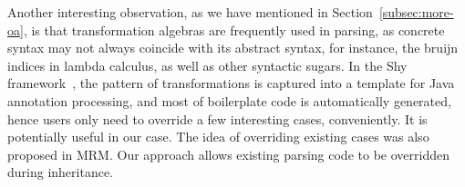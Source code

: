 \begin{comment}
Moreover, in~\cite{Oliveira:2012} the authors have discussed the
composition of algebras. In our parsing approach, a parser consumes an
algebra, which is delegated to return the results, during its process
of parsing. Having a set of algebras, it requires multiple parsing
with several times of invocation, which leads to redundant work.
Instead, algebras are supposed to be composed into one before the
invocation of the parser. Bahr et al. lead a similar discussion
in~\cite{Bahr2011}, where queries (or \textit{catamorphisms}) and
transformations (or \textit{homomorphisms}) are composable. They have
also mentioned the dual process of folds, namely
\textit{anamorphisms}. It is potentially related to our work, as
parsing is a representative kind of unfolds, whereas they only
discussed the composition of a cv-coalgebra and a term homomorphism,
which differs from modular parsing.
\end{comment}

Another interesting observation, as we have mentioned
in Section~\ref{subsec:more-oa}, is that transformation algebras are
frequently used in parsing, as concrete syntax may not always coincide
with its abstract syntax, for instance, the bruijn indices in lambda
calculus, as well as other syntactic sugars. In the Shy
framework~\cite{Zhang2015}, the pattern of transformations is captured
into a template for Java annotation processing, and most of
boilerplate code is automatically generated, hence users only need to
override a few interesting cases, conveniently. It is potentially
useful in our case. The idea of overriding existing cases was also
proposed in MRM. Our approach allows existing parsing code to be
overridden during inheritance.
